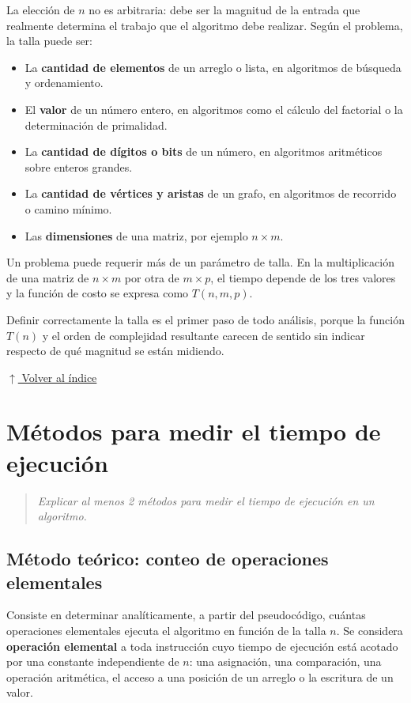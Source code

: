 \documentclass[12pt]{article}
\newcommand{\volverindice}{%
    \vspace{1em}%
    \begin{flushright}%
        \hyperlink{indice}{\small $\uparrow$ Volver al índice}%
    \end{flushright}%
}
\newcommand{\enunciado}[1]{%
    \begin{quote}
        \itshape #1
    \end{quote}
}
\begin{document}
La elección de $n$ no es arbitraria: debe ser la magnitud de la entrada que realmente determina el trabajo que el algoritmo debe realizar. Según el problema, la talla puede ser:

\begin{itemize}[leftmargin=2em]
    \item La \textbf{cantidad de elementos} de un arreglo o lista, en algoritmos de búsqueda y ordenamiento.
    \item El \textbf{valor} de un número entero, en algoritmos como el cálculo del factorial o la determinación de primalidad.
    \item La \textbf{cantidad de dígitos o bits} de un número, en algoritmos aritméticos sobre enteros grandes.
    \item La \textbf{cantidad de vértices y aristas} de un grafo, en algoritmos de recorrido o camino mínimo.
    \item Las \textbf{dimensiones} de una matriz, por ejemplo $n \times m$.
\end{itemize}

Un problema puede requerir más de un parámetro de talla. En la multiplicación de una matriz de $n \times m$ por otra de $m \times p$, el tiempo depende de los tres valores y la función de costo se expresa como $T(n, m, p)$.

Definir correctamente la talla es el primer paso de todo análisis, porque la función $T(n)$ y el orden de complejidad resultante carecen de sentido sin indicar respecto de qué magnitud se están midiendo.

\volverindice
\newpage


\section{Métodos para medir el tiempo de ejecución}

\enunciado{Explicar al menos 2 métodos para medir el tiempo de ejecución en un algoritmo.}

\subsection{Método teórico: conteo de operaciones elementales}

Consiste en determinar analíticamente, a partir del pseudocódigo, cuántas operaciones elementales ejecuta el algoritmo en función de la talla $n$. Se considera \textbf{operación elemental} a toda instrucción cuyo tiempo de ejecución está acotado por una constante independiente de $n$: una asignación, una comparación, una operación aritmética, el acceso a una posición de un arreglo o la escritura de un valor.
\end{document}

